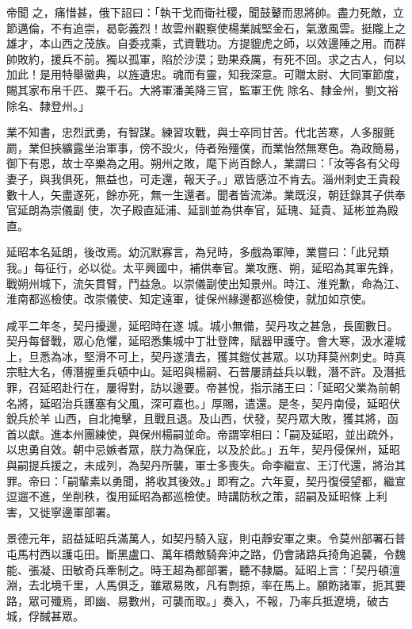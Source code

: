 \begin{pinyinscope}
 帝聞
 之，痛惜甚，俄下詔曰：「執干戈而衛社稷，聞鼓鼙而思將帥。盡力死敵，立節邁倫，不有追崇，曷彰義烈！故雲州觀察使楊業誠堅金石，氣激風雲。挺隴上之雄才，本山西之茂族。自委戎乘，式資戰功。方提貔虎之師，以效邊陲之用。而群帥敗約，援兵不前。獨以孤軍，陷於沙漠；勁果猋厲，有死不回。求之古人，何以加此！是用特舉徽典，以旌遺忠。魂而有靈，知我深意。可贈太尉、大同軍節度，賜其家布帛千匹、粟千石。大將軍潘美降三官，監軍王侁
 除名、隸金州，劉文裕除名、隸登州。」



 業不知書，忠烈武勇，有智謀。練習攻戰，與士卒同甘苦。代北苦寒，人多服氈罽，業但挾纊露坐治軍事，傍不設火，侍者殆殭僕，而業怡然無寒色。為政簡易，御下有恩，故士卒樂為之用。朔州之敗，麾下尚百餘人，業謂曰：「汝等各有父母妻子，與我俱死，無益也，可走還，報天子。」眾皆感泣不肯去。淄州刺史王貴殺數十人，矢盡遂死，餘亦死，無一生還者。聞者皆流涕。業既沒，朝廷錄其子供奉官延朗為崇儀副
 使，次子殿直延浦、延訓並為供奉官，延瑰、延貴、延彬並為殿直。



 延昭本名延朗，後改焉。幼沉默寡言，為兒時，多戲為軍陣，業嘗曰：「此兒類我。」每征行，必以從。太平興國中，補供奉官。業攻應、朔，延昭為其軍先鋒，戰朔州城下，流矢貫臂，鬥益急。以崇儀副使出知景州。時江、淮兇歉，命為江、淮南都巡檢使。改崇儀使、知定遠軍，徙保州緣邊都巡檢使，就加如京使。



 咸平二年冬，契丹擾邊，延昭時在遂
 城。城小無備，契丹攻之甚急，長圍數日。契丹每督戰，眾心危懼，延昭悉集城中丁壯登陴，賦器甲護守。會大寒，汲水灌城上，旦悉為冰，堅滑不可上，契丹遂潰去，獲其鎧仗甚眾。以功拜莫州刺史。時真宗駐大名，傅潛握重兵頓中山。延昭與楊嗣、石普屢請益兵以戰，潛不許。及潛抵罪，召延昭赴行在，屢得對，訪以邊要。帝甚悅，指示諸王曰：「延昭父業為前朝名將，延昭治兵護塞有父風，深可嘉也。」厚賜，遣還。是冬，契丹南侵，延昭伏銳兵於羊
 山西，自北掩擊，且戰且退。及山西，伏發，契丹眾大敗，獲其將，函首以獻。進本州團練使，與保州楊嗣並命。帝謂宰相曰：「嗣及延昭，並出疏外，以忠勇自效。朝中忌嫉者眾，朕力為保庇，以及於此。」五年，契丹侵保州，延昭與嗣提兵援之，未成列，為契丹所襲，軍士多喪失。命李繼宣、王汀代還，將治其罪。帝曰：「嗣輩素以勇聞，將收其後效。」即宥之。六年夏，契丹復侵望都，繼宣逗遛不進，坐削秩，復用延昭為都巡檢使。時講防秋之策，詔嗣及延昭條
 上利害，又徙寧邊軍部署。



 景德元年，詔益延昭兵滿萬人，如契丹騎入寇，則屯靜安軍之東。令莫州部署石普屯馬村西以護屯田。斷黑盧口、萬年橋敵騎奔沖之路，仍會諸路兵掎角追襲，令魏能、張凝、田敏奇兵牽制之。時王超為都部署，聽不隸屬。延昭上言：「契丹頓澶淵，去北境千里，人馬俱乏，雖眾易敗，凡有剽掠，率在馬上。願飭諸軍，扼其要路，眾可殲焉，即幽、易數州，可襲而取。」奏入，不報，乃率兵抵遼境，破古城，俘馘甚眾。




\end{pinyinscope}

